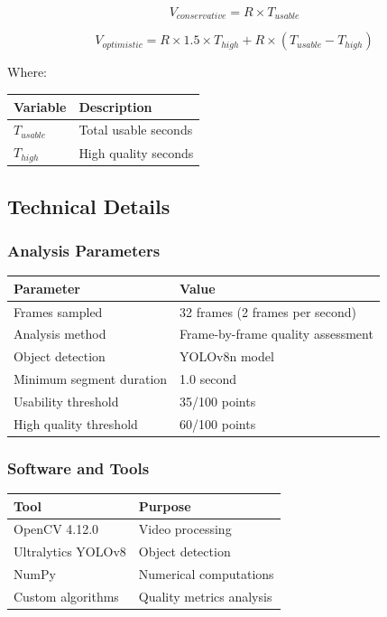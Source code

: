 \documentclass[
  11pt,
]{article}
\begin{document}
\[V_{conservative} = R \times T_{usable}\]

\[V_{optimistic} = R \times 1.5 \times T_{high} + R \times (T_{usable} - T_{high})\]

Where:

\begin{longtable}[]{@{}ll@{}}
\toprule\noalign{}
Variable & Description \\
\midrule\noalign{}
\endhead
\bottomrule\noalign{}
\endlastfoot
\(T_{usable}\) & Total usable seconds \\
\(T_{high}\) & High quality seconds \\
\end{longtable}

\hypertarget{technical-details}{%
\subsection{Technical Details}\label{technical-details}}

\hypertarget{analysis-parameters}{%
\subsubsection{Analysis Parameters}\label{analysis-parameters}}

\begin{longtable}[]{@{}ll@{}}
\toprule\noalign{}
Parameter & Value \\
\midrule\noalign{}
\endhead
\bottomrule\noalign{}
\endlastfoot
Frames sampled & 32 frames (2 frames per second) \\
Analysis method & Frame-by-frame quality assessment \\
Object detection & YOLOv8n model \\
Minimum segment duration & 1.0 second \\
Usability threshold & 35/100 points \\
High quality threshold & 60/100 points \\
\end{longtable}

\hypertarget{software-and-tools}{%
\subsubsection{Software and Tools}\label{software-and-tools}}

\begin{longtable}[]{@{}ll@{}}
\toprule\noalign{}
Tool & Purpose \\
\midrule\noalign{}
\endhead
\bottomrule\noalign{}
\endlastfoot
OpenCV 4.12.0 & Video processing \\
Ultralytics YOLOv8 & Object detection \\
NumPy & Numerical computations \\
Custom algorithms & Quality metrics analysis \\
\end{longtable}
\end{document}
